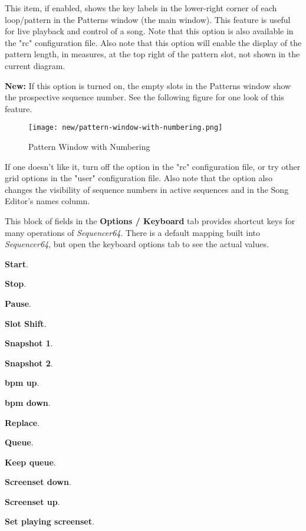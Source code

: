    \setcounter{ItemCounter}{0}      %

   This item, if enabled, shows the key labels in the lower-right corner of
   each loop/pattern in the Patterns window (the main window).  This feature is
   useful for live playback and control of a song.
   Note that this option is also available in the "rc" configuration file.
   Also note that this option will enable the display of the pattern length, in
   measures, at the top right of the pattern slot, not shown in the current
   diagram.

   \textbf{New:}
   If this option is turned on, the
   empty slots in the Patterns window show the prospective sequence number.
   See the following figure for one look of this feature.

\begin{figure}[H]
   \centering 
   \texttt{[image: new/pattern-window-with-numbering.png]}
   \caption{Pattern Window with Numbering}
   \label{fig:seq64_build_with_numbering}
\end{figure}

   If one doesn't like it, turn off the option in the "rc" configuration file,
   or try other grid options in the "user" configuration file.
   Also note that the option also changes the visibility of sequence numbers
   in active sequences and in the Song Editor's names column.

   This block of fields in the \textbf{Options / Keyboard} tab
   provides shortcut keys for many operations of
   \textsl{Sequencer64}.  There is a default mapping built into
   \textsl{Sequencer64}, but open the keyboard options tab to see
   the actual values.
   

   \begin{enumber}
      \item \textbf{Start}.
      \item \textbf{Stop}.
      \item \textbf{Pause}.
      \item \textbf{Slot Shift}.
      \item \textbf{Snapshot 1}.
      \item \textbf{Snapshot 2}.
      \item \textbf{bpm up}.
      \item \textbf{bpm down}.
      \item \textbf{Replace}.
      \item \textbf{Queue}.
      \item \textbf{Keep queue}.
      \item \textbf{Screenset down}.
      \item \textbf{Screenset up}.
      \item \textbf{Set playing screenset}.
   \end{enumber}

